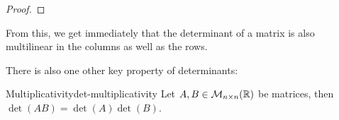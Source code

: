 \documentclass{styles/tufte}
\begin{document}
  \begin{proof}
    
  \end{proof}
  
  From this, we get immediately that the determinant of a matrix is also multilinear in the columns as well as the rows.
  
  There is also one other key property of determinants:
  
  \begin{theorem}{Multiplicativity}{det-multiplicativity}
    Let $A, B \in \mathcal{M}_{n\times n}(\mathbb{R})$ be matrices, then $\det(AB) = \det(A)\det(B)$.
  \end{theorem}
\end{document}
